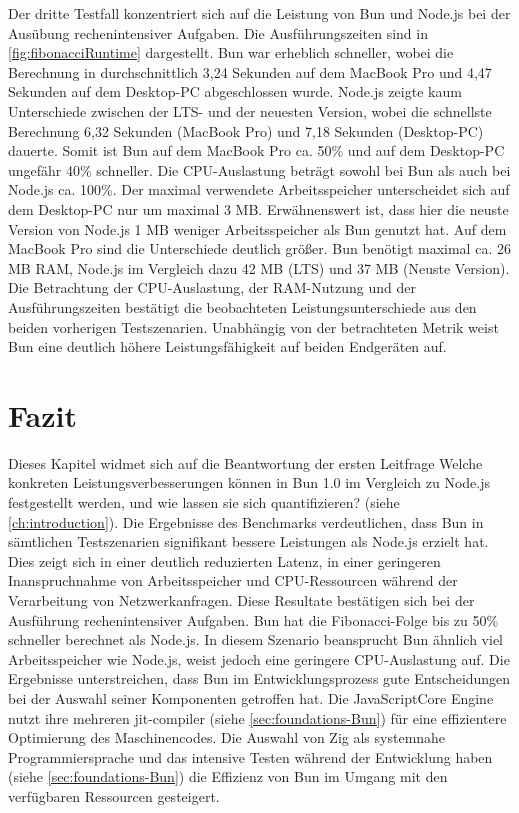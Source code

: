 \noindent
Der dritte Testfall konzentriert sich auf die Leistung von Bun und Node.js bei der Ausübung rechenintensiver Aufgaben. Die Ausführungszeiten sind in \autoref{fig:fibonacciRuntime} dargestellt. Bun war erheblich schneller, wobei die Berechnung in durchschnittlich 3,24 Sekunden auf dem MacBook Pro und 4,47 Sekunden auf dem Desktop-PC abgeschlossen wurde. Node.js zeigte kaum Unterschiede zwischen der LTS- und der neuesten Version, wobei die schnellste Berechnung 6,32 Sekunden (MacBook Pro) und 7,18 Sekunden (Desktop-PC) dauerte. Somit ist Bun auf dem MacBook Pro ca. 50\% und auf dem Desktop-PC ungefähr 40\% schneller. Die CPU-Auslastung beträgt sowohl bei Bun als auch bei Node.js ca. 100\%. Der maximal verwendete Arbeitsspeicher unterscheidet sich auf dem Desktop-PC nur um maximal 3 MB. Erwähnenswert ist, dass hier die neuste Version von Node.js 1 MB weniger Arbeitsspeicher als Bun genutzt hat. Auf dem MacBook Pro sind die Unterschiede deutlich größer. Bun benötigt maximal ca. 26 MB RAM, Node.js im Vergleich dazu 42 MB (LTS) und 37 MB (Neuste Version).\newline
Die Betrachtung der CPU-Auslastung, der RAM-Nutzung und der Ausführungszeiten bestätigt die beobachteten Leistungsunterschiede aus den beiden vorherigen Testszenarien. Unabhängig von der betrachteten Metrik weist Bun eine deutlich höhere Leistungsfähigkeit auf beiden Endgeräten auf.

\section{Fazit} \label{sec:performance-conclusion}
Dieses Kapitel widmet sich auf die Beantwortung der ersten Leitfrage \glqq Welche konkreten Leistungsverbesserungen können in Bun 1.0 im Vergleich zu Node.js festgestellt werden, und wie lassen sie sich quantifizieren?\grqq{} (siehe \autoref{ch:introduction}). Die Ergebnisse des Benchmarks verdeutlichen, dass Bun in sämtlichen Testszenarien signifikant bessere Leistungen als Node.js erzielt hat. Dies zeigt sich in einer deutlich reduzierten Latenz, in einer geringeren Inanspruchnahme von Arbeitsspeicher und CPU-Ressourcen während der Verarbeitung von Netzwerkanfragen. Diese Resultate bestätigen sich bei der Ausführung rechenintensiver Aufgaben. Bun hat die Fibonacci-Folge bis zu 50\% schneller berechnet als Node.js. In diesem Szenario beansprucht Bun ähnlich viel Arbeitsspeicher wie Node.js, weist jedoch eine geringere CPU-Auslastung auf. \newline
Die Ergebnisse unterstreichen, dass Bun im Entwicklungsprozess gute Entscheidungen bei der Auswahl seiner Komponenten getroffen hat. Die JavaScriptCore Engine nutzt ihre mehreren \ac{jit-compiler} (siehe \autoref{sec:foundations-Bun}) für eine effizientere Optimierung des Maschinencodes. Die Auswahl von Zig als systemnahe Programmiersprache und das intensive Testen während der Entwicklung haben (siehe \autoref{sec:foundations-Bun}) die Effizienz von Bun im Umgang mit den verfügbaren Ressourcen gesteigert.\\

